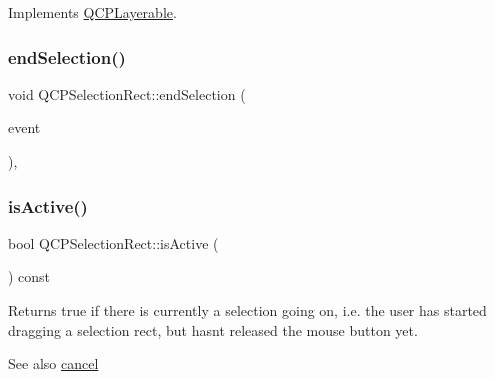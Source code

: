 Implements \hyperlink{class_q_c_p_layerable_aecf2f7087482d4b6a78cb2770e5ed12d}{Q\+C\+P\+Layerable}.

\mbox{\label{class_q_c_p_selection_rect_a625bcffd73987f6de6c6559aaf29ab9d}} 
\subsubsection{\texorpdfstring{end\+Selection()}{endSelection()}}
{\footnotesize\ttfamily void Q\+C\+P\+Selection\+Rect\+::end\+Selection (\begin{DoxyParamCaption}\item[{Q\+Mouse\+Event $\ast$}]{event }\end{DoxyParamCaption})\hspace{0.3cm}{\ttfamily [protected]}, {\ttfamily [virtual]}}

\mbox{\label{class_q_c_p_selection_rect_ad27c1569c6ea8fa48e24b81e2a302df3}} 
\subsubsection{\texorpdfstring{is\+Active()}{isActive()}}
{\footnotesize\ttfamily bool Q\+C\+P\+Selection\+Rect\+::is\+Active (\begin{DoxyParamCaption}{ }\end{DoxyParamCaption}) const\hspace{0.3cm}{\ttfamily [inline]}}

Returns true if there is currently a selection going on, i.\+e. the user has started dragging a selection rect, but hasn\textquotesingle{}t released the mouse button yet.

\begin{DoxySeeAlso}{See also}
\hyperlink{class_q_c_p_selection_rect_af67bc58f4f5ce9a4dc420b9c42de235a}{cancel} 
\end{DoxySeeAlso}
\mbox{\label{class_q_c_p_selection_rect_a1affe764316d6122a26fdb2e9583feb1}} 
